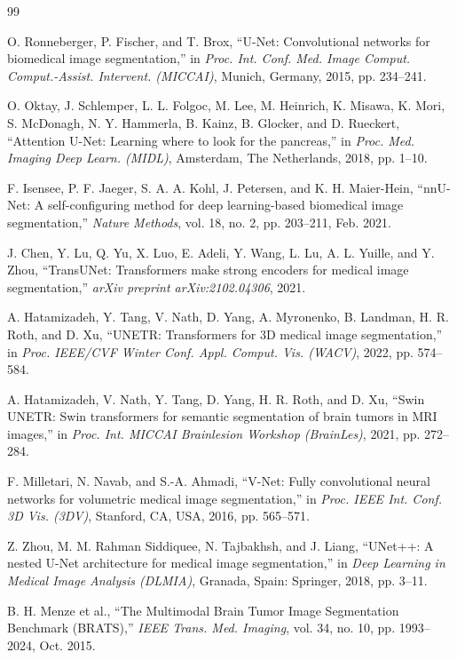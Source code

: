 \documentclass[conference]{IEEEtran}
\begin{document}
\begin{thebibliography}{99}

O. Ronneberger, P. Fischer, and T. Brox, ``U-Net: Convolutional networks for biomedical image segmentation,'' in \textit{Proc. Int. Conf. Med. Image Comput. Comput.-Assist. Intervent. (MICCAI)}, Munich, Germany, 2015, pp. 234--241.

O. Oktay, J. Schlemper, L. L. Folgoc, M. Lee, M. Heinrich, K. Misawa, K. Mori, S. McDonagh, N. Y. Hammerla, B. Kainz, B. Glocker, and D. Rueckert, ``Attention U-Net: Learning where to look for the pancreas,'' in \textit{Proc. Med. Imaging Deep Learn. (MIDL)}, Amsterdam, The Netherlands, 2018, pp. 1--10.

F. Isensee, P. F. Jaeger, S. A. A. Kohl, J. Petersen, and K. H. Maier-Hein, ``nnU-Net: A self-configuring method for deep learning-based biomedical image segmentation,'' \textit{Nature Methods}, vol. 18, no. 2, pp. 203--211, Feb. 2021.

J. Chen, Y. Lu, Q. Yu, X. Luo, E. Adeli, Y. Wang, L. Lu, A. L. Yuille, and Y. Zhou, ``TransUNet: Transformers make strong encoders for medical image segmentation,'' \textit{arXiv preprint arXiv:2102.04306}, 2021.

A. Hatamizadeh, Y. Tang, V. Nath, D. Yang, A. Myronenko, B. Landman, H. R. Roth, and D. Xu, ``UNETR: Transformers for 3D medical image segmentation,'' in \textit{Proc. IEEE/CVF Winter Conf. Appl. Comput. Vis. (WACV)}, 2022, pp. 574--584.

A. Hatamizadeh, V. Nath, Y. Tang, D. Yang, H. R. Roth, and D. Xu, ``Swin UNETR: Swin transformers for semantic segmentation of brain tumors in MRI images,'' in \textit{Proc. Int. MICCAI Brainlesion Workshop (BrainLes)}, 2021, pp. 272--284.

F. Milletari, N. Navab, and S.-A. Ahmadi, ``V-Net: Fully convolutional neural networks for volumetric medical image segmentation,'' in \textit{Proc. IEEE Int. Conf. 3D Vis. (3DV)}, Stanford, CA, USA, 2016, pp. 565--571.

Z. Zhou, M. M. Rahman Siddiquee, N. Tajbakhsh, and J. Liang, ``UNet++: A nested U-Net architecture for medical image segmentation,'' in \textit{Deep Learning in Medical Image Analysis (DLMIA)}, Granada, Spain: Springer, 2018, pp. 3--11.

B. H. Menze et al., ``The Multimodal Brain Tumor Image Segmentation Benchmark (BRATS),'' \textit{IEEE Trans. Med. Imaging}, vol. 34, no. 10, pp. 1993--2024, Oct. 2015.


\end{thebibliography}
\end{document}
